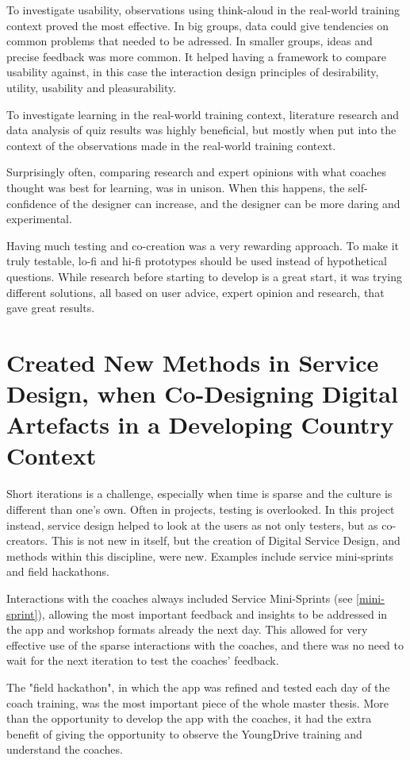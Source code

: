 To investigate usability, observations using think-aloud in the real-world training context proved the most effective. In big groups, data could give tendencies on common problems that needed to be adressed. In smaller groups, ideas and precise feedback was more common. It helped having a framework to compare usability against, in this case the interaction design principles of desirability, utility, usability and pleasurability.

To investigate learning in the real-world training context, literature research and data analysis of quiz results was highly beneficial, but mostly when put into the context of the observations made in the real-world training context.

Surprisingly often, comparing research and expert opinions with what coaches thought was best for learning, was in unison. When this happens, the self-confidence of the designer can increase, and the designer can be more daring and experimental.

Having much testing and co-creation was a very rewarding approach. To make it truly testable, lo-fi and hi-fi prototypes should be used instead of hypothetical questions. While research before starting to develop is a great start, it was trying different solutions, all based on user advice, expert opinion and research, that gave great results.

\section{Created New Methods in Service Design, when Co-Designing Digital Artefacts in a Developing Country Context}
Short iterations is a challenge, especially when time is sparse and the culture is different than one's own. Often in projects, testing is overlooked. In this project instead, service design helped to look at the users as not only testers, but as co-creators. This is not new in itself, but the creation of Digital Service Design, and methods within this discipline, were new. Examples include service mini-sprints and field hackathons.

Interactions with the coaches always included Service Mini-Sprints (see \ref{mini-sprint}), allowing the most important feedback and insights to be addressed in the app and workshop formats already the next day. This allowed for very effective use of the sparse interactions with the coaches, and there was no need to wait for the next iteration to test the coaches' feedback.

The "field hackathon", in which the app was refined and tested each day of the coach training, was the most important piece of the whole master thesis. More than the opportunity to develop the app with the coaches, it had the extra benefit of giving the opportunity to observe the YoungDrive training and understand the coaches.

